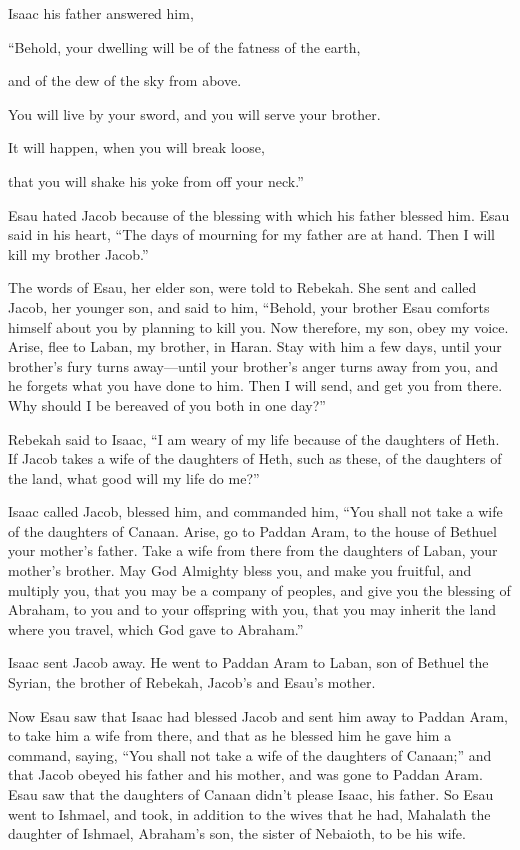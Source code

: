 \myverse{}Isaac his father answered him,

“Behold, your dwelling will be of the fatness of the earth,

and of the dew of the sky from above.

\myverse{}You will live by your sword, and you will serve your brother.

It will happen, when you will break loose,

that you will shake his yoke from off your neck.”

\myverse{}Esau hated Jacob because of the blessing with which his father blessed him. Esau said in his heart, “The days of mourning for my father are at hand. Then I will kill my brother Jacob.”

\myverse{}The words of Esau, her elder son, were told to Rebekah. She sent and called Jacob, her younger son, and said to him, “Behold, your brother Esau comforts himself about you by planning to kill you. \myverse{}Now therefore, my son, obey my voice. Arise, flee to Laban, my brother, in Haran. \myverse{}Stay with him a few days, until your brother’s fury turns away—\myverse{}until your brother’s anger turns away from you, and he forgets what you have done to him. Then I will send, and get you from there. Why should I be bereaved of you both in one day?”

\myverse{}Rebekah said to Isaac, “I am weary of my life because of the daughters of Heth. If Jacob takes a wife of the daughters of Heth, such as these, of the daughters of the land, what good will my life do me?”

\mychapter{}
\myverse*{}Isaac called Jacob, blessed him, and commanded him, “You shall not take a wife of the daughters of Canaan. \myverse{}Arise, go to Paddan Aram, to the house of Bethuel your mother’s father. Take a wife from there from the daughters of Laban, your mother’s brother. \myverse{}May God Almighty bless you, and make you fruitful, and multiply you, that you may be a company of peoples, \myverse{}and give you the blessing of Abraham, to you and to your offspring with you, that you may inherit the land where you travel, which God gave to Abraham.”

\myverse{}Isaac sent Jacob away. He went to Paddan Aram to Laban, son of Bethuel the Syrian, the brother of Rebekah, Jacob’s and Esau’s mother.

\myverse{}Now Esau saw that Isaac had blessed Jacob and sent him away to Paddan Aram, to take him a wife from there, and that as he blessed him he gave him a command, saying, “You shall not take a wife of the daughters of Canaan;” \myverse{}and that Jacob obeyed his father and his mother, and was gone to Paddan Aram. \myverse{}Esau saw that the daughters of Canaan didn’t please Isaac, his father. \myverse{}So Esau went to Ishmael, and took, in addition to the wives that he had, Mahalath the daughter of Ishmael, Abraham’s son, the sister of Nebaioth, to be his wife.

